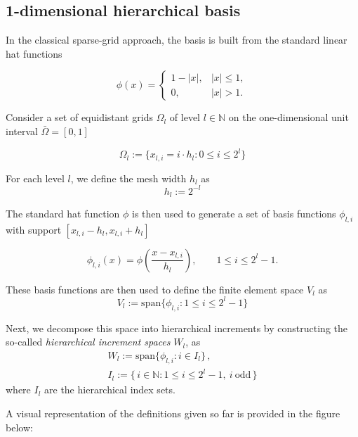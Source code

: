 \subsection{1-dimensional hierarchical basis}

In the classical sparse-grid approach,
the basis is built from the standard linear hat functions

$$
\phi(x)=
\begin{cases}
1-|x|, & |x|\le 1,\\
0, & |x|>1.
\end{cases}
$$

Consider a set of equidistant grids $\Omega_l$ of level $l\in\mathbb{N}$ on the one-dimensional unit interval $\bar{\Omega}=\left[0,1\right]$

$$
\Omega_l := \{x_{l,i}=i\cdot h_l : 0\le i\le 2^l\}
$$

For each level $l$, we define the mesh width $h_l$ as
$$
h_l := 2^{-l}
$$

The standard hat function $\phi$ is then used to generate a set of basis functions $\phi_{l,i}$
with support $\left[ x_{l,i}-h_l, x_{l,i}+h_l \right]$


$$
\phi_{l,i}(x)
=
\phi\!\left(\frac{x-x_{l,i}}{h_l}\right),
\qquad 1\le i\le 2^l-1.
$$

These basis functions are then used to define the finite element space $V_l$ as
$$
V_l := \mathrm{span}\{\phi_{l,i} : 1\le i\le 2^l-1\}
$$

Next, we decompose this space into hierarchical increments by constructing the so-called
\textit{hierarchical increment spaces} $W_l$, as
\begin{gather*}
W_l := \mathrm{span}\{\phi_{l,i}: i\in I_l\}\,,\\
I_l := \{\, i\in\mathbb{N} : 1\le i\le 2^l-1,\ i\ \text{odd}\,\}
\end{gather*}
where $I_l$ are the hierarchical index sets.

A visual representation of the definitions given so far is provided in the figure below:

